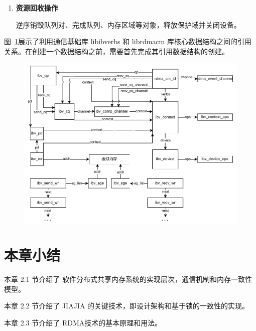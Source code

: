 {\begin{enumerate}[label=\textbf{步骤 \arabic*.}, leftmargin=0.5cm, align=left]
              详见第\ref{chap:sdsm}章的\ref{sec:process}小节。

        \item \textbf{资源回收操作}

              逆序销毁队列对、完成队列、内存区域等对象，释放保护域并关闭设备。
    \end{enumerate}

    图~\ref{fig:RDMA-structs}展示了利用通信基础库 libibverbs 和 librdmacm 库核心数据结构之间的引用关系。在创建一个数据结构之前，需要首先完成其引用数据结构的创建。
    \begin{figure}[!htbp]
        \centering
        \includegraphics[width=\linewidth]{Img/RDMA关键数据结构.drawio.pdf}
        \label{fig:RDMA-structs}
    \end{figure}

    \section{本章小结}

    本章 2.1 节介绍了 软件分布式共享内存系统的实现层次，通信机制和内存一致性模型。

    本章 2.2 节介绍了 JIAJIA 的关键技术，即设计架构和基于锁的一致性的实现。

    本章 2.3 节介绍了 RDMA技术的基本原理和用法。
}